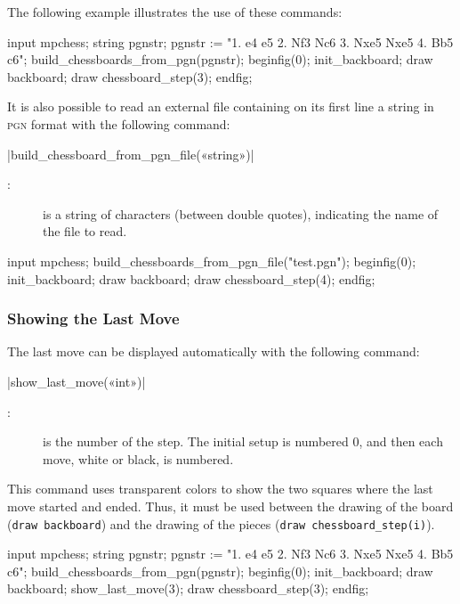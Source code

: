 \documentclass[english]{ltxdoc}
\begin{document}
The following example illustrates the use of these commands:

\begin{ExempleMP}
input mpchess;
string pgnstr;
pgnstr := "1. e4 e5 2. Nf3 Nc6 3. Nxe5 Nxe5 4. Bb5 c6";
build_chessboards_from_pgn(pgnstr);
beginfig(0);
init_backboard;
draw backboard;
draw chessboard_step(3); %
endfig;
\end{ExempleMP}


It is also possible to read an external file containing on its first line a
string in  \textsc{pgn} format with the following command:

\commande|build_chessboard_from_pgn_file(«string»)|\smallskip

\begin{description}
  \item[:] is a string of characters (between double quotes),
  indicating the name of the file to read.  
\end{description}

\begin{ExempleMP}
input mpchess;
build_chessboards_from_pgn_file("test.pgn");
beginfig(0);
init_backboard;
draw backboard;
draw chessboard_step(4); %
endfig;
\end{ExempleMP}

\subsubsection{Showing the Last Move}

The last move can be displayed automatically with the following command:

\commande|show_last_move(«int»)|\smallskip

\begin{description}
\item[:] is the number of the step. The initial setup is numbered 0, and then each move, white or black, is numbered.
\end{description}

This command uses transparent colors to show the two squares where the last move
started and ended. Thus, it must be used between the drawing of the board
(\lstinline+draw backboard+) and the drawing of the pieces 
(\lstinline+draw chessboard_step(i)+).

\begin{ExempleMP}
input mpchess;
string pgnstr;
pgnstr := "1. e4 e5 2. Nf3 Nc6 3. Nxe5 Nxe5 4. Bb5 c6";
build_chessboards_from_pgn(pgnstr);
beginfig(0);
init_backboard;
draw backboard;
show_last_move(3);
draw chessboard_step(3); %
endfig;
\end{ExempleMP}
\end{document}

